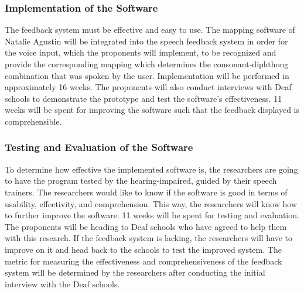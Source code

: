 \subsubsection{Implementation of the Software}
The feedback system must be effective and easy to use. The mapping software of Natalie Agustin \citeyear{agustin:2014:SOM} will be integrated into the speech feedback system in order for the voice input, which the proponents will implement, to be recognized and provide the corresponding mapping which determines the consonant-diphthong combination that was spoken by the user. Implementation will be performed in approximately 16 weeks. The proponents will also conduct interviews with Deaf schools to demonstrate the prototype and test the software's effectiveness. 11 weeks will be spent for improving the software such that the feedback displayed is comprehensible.

\subsubsection{Testing and Evaluation of the Software}
To determine how effective the implemented software is, the researchers are going to have the program tested by the hearing-impaired, guided by their speech trainers. The researchers would like to know if the software is good in terms of usability, effectivity, and comprehension. This way, the researchers will know how to further improve the software. 11 weeks will be spent for testing and evaluation. The proponents will be heading to Deaf schools who have agreed to help them with this research. If the feedback system is lacking, the researchers will have to improve on it and head back to the schools to test the improved system. The metric for measuring the effectiveness and comprehensiveness of the feedback system will be determined by the researchers after conducting the initial interview with the Deaf schools.

